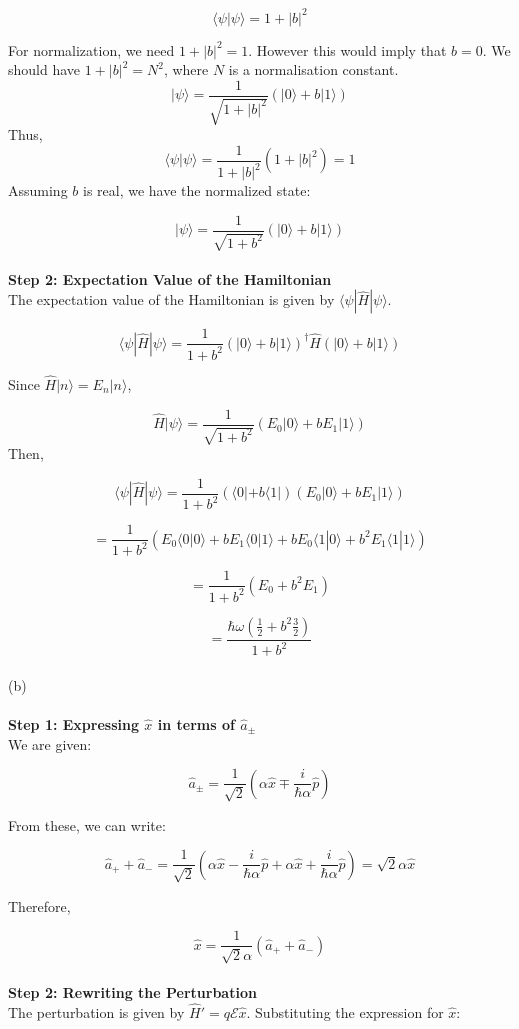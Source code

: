 \documentclass{article}
\begin{document}
\[
\langle\psi|\psi\rangle = 1 + |b|^2
\]

For normalization, we need \(1 + |b|^2 = 1\). However this would imply that \(b=0\). We should have \(1 + |b|^2 = N^2\), where \(N\) is a normalisation constant.
\[
|\psi\rangle = \frac{1}{\sqrt{1+|b|^2}}(|0\rangle + b|1\rangle)
\]
Thus,
\[
\langle\psi|\psi\rangle = \frac{1}{1+|b|^2}(1 + |b|^2) = 1
\]
Assuming \(b\) is real, we have the normalized state:

\[
|\psi\rangle = \frac{1}{\sqrt{1+b^2}}(|0\rangle + b|1\rangle)
\]
\noindent \\
\textbf{Step 2: Expectation Value of the Hamiltonian} \\
The expectation value of the Hamiltonian is given by \(\langle\psi|\hat{H}|\psi\rangle\).

\[
\langle\psi|\hat{H}|\psi\rangle = \frac{1}{1+b^2} (|0\rangle + b|1\rangle)^\dagger \hat{H} (|0\rangle + b|1\rangle)
\]

Since \(\hat{H}|n\rangle = E_n|n\rangle\),

\[
\hat{H}|\psi\rangle = \frac{1}{\sqrt{1+b^2}} (E_0|0\rangle + b E_1|1\rangle)
\]
Then,

\[
\langle\psi|\hat{H}|\psi\rangle = \frac{1}{1+b^2} (\langle 0| + b\langle 1|) (E_0|0\rangle + b E_1|1\rangle)
\]

\[
= \frac{1}{1+b^2} (E_0 \langle 0|0\rangle + b E_1 \langle 0|1\rangle + b E_0 \langle 1|0\rangle + b^2 E_1 \langle 1|1\rangle)
\]

\[
= \frac{1}{1+b^2} (E_0 + b^2 E_1)
\]

\[
= \frac{\hbar\omega(\frac{1}{2} + b^2\frac{3}{2})}{1+b^2}
\]
\noindent \\
\noindent (b) \\

\noindent \\
\textbf{Step 1: Expressing \(\hat{x}\) in terms of \(\hat{a}_\pm\)} \\
We are given:

\[
\hat{a}_\pm = \frac{1}{\sqrt{2}} \left(\alpha \hat{x} \mp \frac{i}{\hbar \alpha} \hat{p}\right)
\]

From these, we can write:

\[
\hat{a}_+ + \hat{a}_- = \frac{1}{\sqrt{2}}(\alpha \hat{x} - \frac{i}{\hbar \alpha} \hat{p} + \alpha \hat{x} + \frac{i}{\hbar \alpha} \hat{p}) = \sqrt{2} \alpha \hat{x}
\]

Therefore,

\[
\hat{x} = \frac{1}{\sqrt{2} \alpha} (\hat{a}_+ + \hat{a}_-)
\]
\noindent \\
\textbf{Step 2: Rewriting the Perturbation} \\
The perturbation is given by \(\hat{H}' = q \mathcal{E} \hat{x}\). Substituting the expression for \(\hat{x}\):
\end{document}
